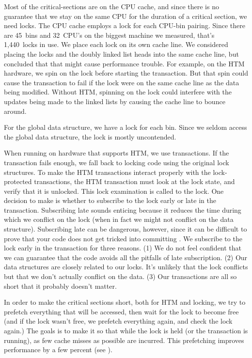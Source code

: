 \documentclass[pldi]{sigplanconf-pldi15}
\begin{document}
Most of the critical-sections are on the CPU cache, and since there is
no guarantee that we stay on the same CPU for the duration of a
critical section, we need locks.  The CPU cache employs a lock for
each CPU-bin pairing.  Since there are 45~bins and 32~CPU's on the
biggest machine we measured, that's 1,440~locks in use.  We place each
lock on its own cache line.  We considered placing the locks and the
doubly linked list heads into the same cache line, but concluded that
that might cause performance trouble.  For example, on the HTM
hardware, we spin on the lock before starting the transaction.  But
that spin could cause the transaction to fail if the lock were on the
same cache line as the data being modified.  Without HTM, spinning on
the lock could interfere with the updates being made to the linked
lists by causing the cache line to bounce around.

For the global data structure, we have a lock for each bin.  Since we
seldom access the global data structure, the lock is mostly
uncontended.

When running on hardware that supports HTM, we use transactions.  If
the transaction fails enough, we fall back to locking code using the
original lock structures.  To make the HTM transactions interact
properly with the lock-protected transactions, the HTM transaction
must look at the lock state, and verify that it is unlocked.  This
lock examination is called  to the lock.  One
decision to make is whether to subscribe to the lock early or late in
the transaction.  Subscribing late sounds enticing because it reduces
the time during which we conflict on the lock (when in fact we might
not conflict on the data structure).  Subscribing late can be
dangerous, however, since it can be difficult to prove that your code
does not get tricked into committing \cite{DiceHaKo14}.  We subscribe
to the lock early in the transaction for three reasons.  (1) We do not
feel confident that we can guarantee that the code avoids all the
pitfalls of late subscription.  (2) Our data structures are closely
related to our locks.  It's unlikely that the lock conflicts but that
we don't actually conflict on the data.  (3) Our transactions are all
so short that it probably doesn't matter.

In order to make the critical sections short, both for HTM and
locking, we try to prefetch everything that will be accessed, then
wait for the lock to become free (and if the lock wasn't free, we
prefetch everything again, and check the lock again.)  The goals is to
make it so that while the lock is held (or the transaction is
running), as few cache misses as possible are incurred.  This
prefetching improves performance by a few percent (see
).
\end{document}

